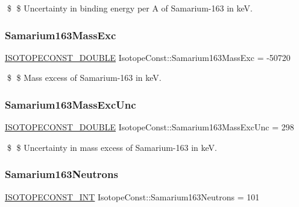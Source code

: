 \$ \$ Uncertainty in binding energy per A of Samarium-\/163 in keV. \mbox{\label{group___isotope_const-_samarium-_sm163_gad37d6252beb81893bade9126e608fb08}} 
\subsubsection{\texorpdfstring{Samarium163\+Mass\+Exc}{Samarium163MassExc}}
{\footnotesize\ttfamily \mbox{\hyperlink{group___isotope_const-_macros_ga8f45a7272ce02c0b4c65c44636ed719a}{I\+S\+O\+T\+O\+P\+E\+C\+O\+N\+S\+T\+\_\+\+D\+O\+U\+B\+LE}} Isotope\+Const\+::\+Samarium163\+Mass\+Exc = -\/50720}

\$ \$ Mass excess of Samarium-\/163 in keV. \mbox{\label{group___isotope_const-_samarium-_sm163_ga977d0ce17c2e2aaa7dd23b0525e8ae54}} 
\subsubsection{\texorpdfstring{Samarium163\+Mass\+Exc\+Unc}{Samarium163MassExcUnc}}
{\footnotesize\ttfamily \mbox{\hyperlink{group___isotope_const-_macros_ga8f45a7272ce02c0b4c65c44636ed719a}{I\+S\+O\+T\+O\+P\+E\+C\+O\+N\+S\+T\+\_\+\+D\+O\+U\+B\+LE}} Isotope\+Const\+::\+Samarium163\+Mass\+Exc\+Unc = 298}

\$ \$ Uncertainty in mass excess of Samarium-\/163 in keV. \mbox{\label{group___isotope_const-_samarium-_sm163_ga76bc4f0c5a3116f067705d71543f16dc}} 
\subsubsection{\texorpdfstring{Samarium163\+Neutrons}{Samarium163Neutrons}}
{\footnotesize\ttfamily \mbox{\hyperlink{group___isotope_const-_macros_ga5f18360b3e99483a35c32d789e62621c}{I\+S\+O\+T\+O\+P\+E\+C\+O\+N\+S\+T\+\_\+\+I\+NT}} Isotope\+Const\+::\+Samarium163\+Neutrons = 101}

